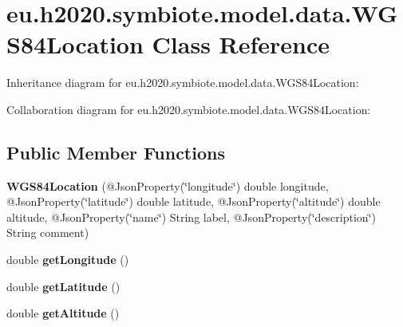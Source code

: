 \hypertarget{classeu_1_1h2020_1_1symbiote_1_1model_1_1data_1_1WGS84Location}{}\section{eu.\+h2020.\+symbiote.\+model.\+data.\+W\+G\+S84\+Location Class Reference}
\label{classeu_1_1h2020_1_1symbiote_1_1model_1_1data_1_1WGS84Location}


Inheritance diagram for eu.\+h2020.\+symbiote.\+model.\+data.\+W\+G\+S84\+Location\+:


Collaboration diagram for eu.\+h2020.\+symbiote.\+model.\+data.\+W\+G\+S84\+Location\+:
\subsection*{Public Member Functions}
\begin{DoxyCompactItemize}
\item 
\mbox{\label{classeu_1_1h2020_1_1symbiote_1_1model_1_1data_1_1WGS84Location_a933fcdb685136f757b323c1fa1581b55}} 
{\bfseries W\+G\+S84\+Location} (@Json\+Property(\char`\"{}longitude\char`\"{}) double longitude, @Json\+Property(\char`\"{}latitude\char`\"{}) double latitude, @Json\+Property(\char`\"{}altitude\char`\"{}) double altitude, @Json\+Property(\char`\"{}name\char`\"{}) String label, @Json\+Property(\char`\"{}description\char`\"{}) String comment)
\item 
\mbox{\label{classeu_1_1h2020_1_1symbiote_1_1model_1_1data_1_1WGS84Location_acd53396a669738039c7dc712ecb84b8a}} 
double {\bfseries get\+Longitude} ()
\item 
\mbox{\label{classeu_1_1h2020_1_1symbiote_1_1model_1_1data_1_1WGS84Location_ae6a3ac23ded0ce242a93b4afd0d58a3e}} 
double {\bfseries get\+Latitude} ()
\item 
\mbox{\label{classeu_1_1h2020_1_1symbiote_1_1model_1_1data_1_1WGS84Location_ae7558c1a19051999c2d3f3742cdf10ee}} 
double {\bfseries get\+Altitude} ()
\end{DoxyCompactItemize}



